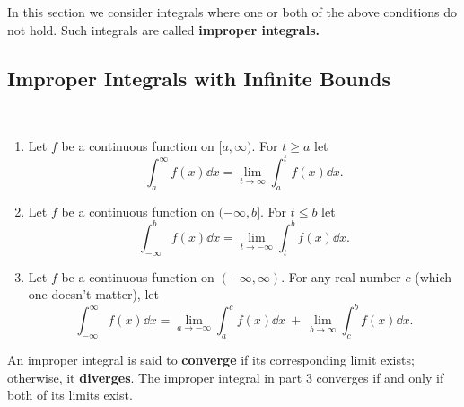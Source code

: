 In this section we consider integrals where one or both of the above conditions do not hold. Such integrals are called \textbf{improper integrals.}

\clearpage

\subsection{Improper Integrals with Infinite Bounds}

\begin{definition}\label{def:imp_int1}
\mbox{}\\[-2\baselineskip]\parbox[t]{\linewidth}{%
\begin{enumerate}
\item		Let $f$ be a continuous function on $[a,\infty)$. For $t \geq a$ let
\[\int_a^\infty f(x)\dd x = \lim_{t\to\infty}\int_a^t f(x)\dd x.\]

\item		Let $f$ be a continuous function on $(-\infty,b]$. For $t \leq b$ let
\[\int_{-\infty}^b f(x)\dd x = \lim_{t\to-\infty}\int_t^b f(x)\dd x.\]

\item		Let $f$ be a continuous function on $(-\infty,\infty)$. For any real number $c$ (which one doesn't matter), let
\[
\int_{-\infty}^\infty f(x)\dd x
= \lim_{a\to-\infty}\int_a^c f(x)\dd x\ +\ \lim_{b\to\infty}\int_c^b f(x)\dd x.
\]
\end{enumerate}}
\end{definition}

An improper integral is said to \textbf{converge} if its corresponding limit exists; otherwise, it \textbf{diverges}. The improper integral in part 3 converges if and only if both of its limits exist.


